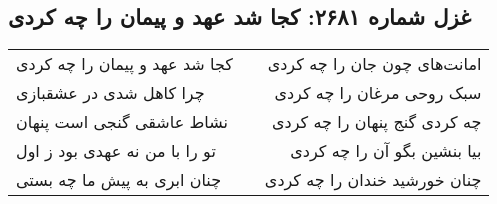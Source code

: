 \begin{center}
\section*{غزل شماره ۲۶۸۱: کجا شد عهد و پیمان را چه کردی}
\label{sec:2681}
\begin{longtable}{l p{0.5cm} r}
کجا شد عهد و پیمان را چه کردی
&&
امانت‌های چون جان را چه کردی
\\
چرا کاهل شدی در عشقبازی
&&
سبک روحی مرغان را چه کردی
\\
نشاط عاشقی گنجی است پنهان
&&
چه کردی گنج پنهان را چه کردی
\\
تو را با من نه عهدی بود ز اول
&&
بیا بنشین بگو آن را چه کردی
\\
چنان ابری به پیش ما چه بستی
&&
چنان خورشید خندان را چه کردی
\\
\end{longtable}
\end{center}
